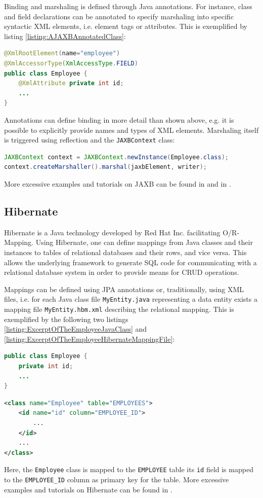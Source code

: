 Binding and marshaling is defined through \gls{Java} annotations.
For instance, class and field declarations can be annotated to specify marshaling into specific syntactic \gls{XML} elements, i.e. element tags or attributes.
This is exemplified by listing \ref{listing:AJAXBAnnotatedClass}:
\begin{lstlisting}[language=Java,caption={A JAXB annotated class},label={listing:AJAXBAnnotatedClass}]
@XmlRootElement(name="employee")
@XmlAccessorType(XmlAccessType.FIELD)
public class Employee {
	@XmlAttribute private int id;
	...
}
\end{lstlisting}
Annotations can define binding in more detail than shown above, e.g. it is possible to explicitly provide names and types of \gls{XML} elements.
Marshaling itself is triggered using reflection and the \texttt{JAXBContext} class:
\begin{lstlisting}[language=Java,caption={JAXB marshaling in Java},label={listing:JAXBMarshalingInJava}]
JAXBContext context = JAXBContext.newInstance(Employee.class);
context.createMarshaller().marshal(jaxbElement, writer);
\end{lstlisting}
More excessive examples and tutorials on \gls{JAXB} can be found in \cite{JAXB} and in \cite{JAXBTutorial}.

\subsection{Hibernate}
\label{subsection:Hibernate}
\gls{Hibernate} \cite{HibernateORM} is a \gls{Java} technology developed by Red Hat Inc. facilitating \gls{O/R-Mapping}.
Using \gls{Hibernate}, one can define mappings from \gls{Java} classes and their instances to tables of relational databases and their rows, and vice versa.
This allows the underlying framework to generate \gls{SQL} code for communicating with a relational database system in order to provide means for CRUD operations.

Mappings can be defined using \gls{JPA} annotations or, traditionally, using \gls{XML} files, i.e. for each \gls{Java} class file \texttt{MyEntity.java} representing a data entity exists a mapping file \texttt{MyEntity.hbm.xml} describing the relational mapping.
This is exemplified by the following two listings \ref{listing:ExcerptOfTheEmployeeJavaClass} and \ref{listing:ExcerptOfTheEmployeeHibernateMappingFile}:
\begin{lstlisting}[language=Java,caption={Excerpt of the Employee Java class},label={listing:ExcerptOfTheEmployeeJavaClass}]
public class Employee {
	private int id;
	...
}
\end{lstlisting}
\begin{lstlisting}[language=Xml,caption={Excerpt of the Employee Hibernate mapping file},label={listing:ExcerptOfTheEmployeeHibernateMappingFile}]
<class name="Employee" table="EMPLOYEES">
	<id name="id" column="EMPLOYEE_ID">
	    ...
	</id>
    ...	
</class>
\end{lstlisting}
Here, the \texttt{Employee} class is mapped to the \texttt{EMPLOYEE} table its \texttt{id} field is mapped to the \texttt{EMPLOYEE\_ID} column as primary key for the table. More excessive examples and tutorials on \gls{Hibernate} can be found in \cite{HibernateORM}.


